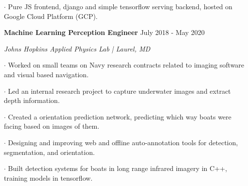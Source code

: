 \documentclass[11pt]{article} %
\begin{document}
    $\boldsymbol{\cdot}$ Pure JS frontend, django and simple tensorflow serving backend, hosted on Google Cloud Platform (GCP). \par 
    \vspace{+4ex}
    \textbf{\large Machine Learning Perception Engineer} \hfill July 2018 - May 2020 \vspace{-0ex}
	\setlength{\parindent}{-0ex} \par
		\textit{Johns Hopkins Applied Physics Lab | Laurel, MD} \vspace{+2ex} \par
		$\boldsymbol{\cdot}$ Worked on small teams on Navy research contracts related to imaging software and visual based navigation. \par \vspace{+1ex}
		$\boldsymbol{\cdot}$ Led an internal research project to capture underwater images and extract depth information. \par \vspace{+1ex}
		$\boldsymbol{\cdot}$ Created a orientation prediction network, predicting which way boats were facing based on images of them. \par \vspace{+1ex}
		$\boldsymbol{\cdot}$ Designing and improving web and offline auto-annotation tools for detection, segmentation, and orientation.\par \vspace{+1ex}
		$\boldsymbol{\cdot}$ Built detection systems for boats in long range infrared imagery in C++, training models in tensorflow. \par \vspace{+1ex}
\end{document}
